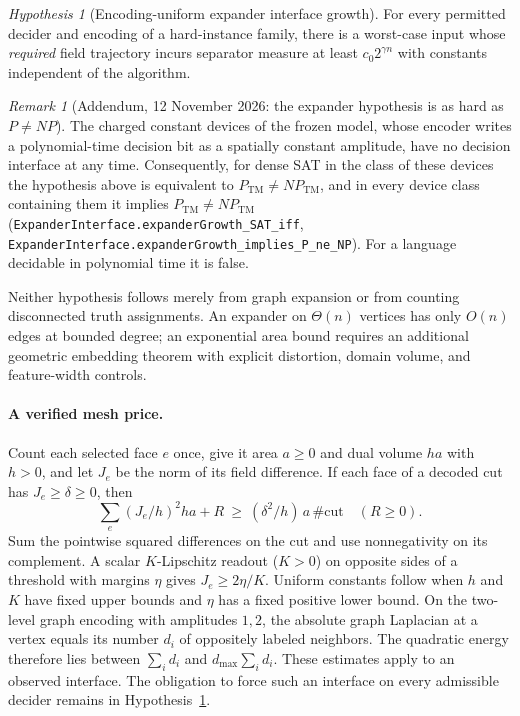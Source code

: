 \documentclass[12pt]{article}
\theoremstyle{remark}
\newtheorem*{remark}{Remark}
\newtheorem{hypothesis}{Hypothesis}[section]
\begin{document}
\begin{hypothesis}[Encoding-uniform expander interface growth]
\label{prop:locked-expander-full}
For every permitted decider and encoding of a hard-instance family,
there is a worst-case input whose \emph{required} field trajectory
incurs separator measure at least $c_0 2^{\gamma n}$ with constants
independent of the algorithm.
\end{hypothesis}
\begin{remark}[Addendum, 12 November 2026: the expander hypothesis is as hard as $P\ne NP$]
The charged constant devices of the frozen model, whose encoder writes a
polynomial-time decision bit as a spatially constant amplitude, have no
decision interface at any time.  Consequently, for dense SAT in the class
of these devices the hypothesis above is equivalent to
$P_{\mathrm{TM}}\ne NP_{\mathrm{TM}}$, and in every device class
containing them it implies $P_{\mathrm{TM}}\ne NP_{\mathrm{TM}}$
(\nolinkurl{ExpanderInterface.expanderGrowth_SAT_iff},
\nolinkurl{ExpanderInterface.expanderGrowth_implies_P_ne_NP}).  For a
language decidable in polynomial time it is false.
\end{remark}
Neither hypothesis follows merely from graph expansion or from
counting disconnected truth assignments. An expander on $\Theta(n)$
vertices has only $O(n)$ edges at bounded degree; an exponential
area bound requires an additional geometric embedding theorem with
explicit distortion, domain volume, and feature-width controls.

\paragraph{A verified mesh price.}
Count each selected face $e$ once, give it area $a\ge0$ and dual volume
$ha$ with $h>0$, and let $J_e$ be the norm of its field difference.
If each face of a decoded cut has $J_e\ge\delta\ge0$, then
\[
 \sum_e (J_e/h)^2ha+R\ \ge\ (\delta^2/h)\,a\,\#\mathrm{cut}
 \quad(R\ge0).
\]
Sum the pointwise squared differences on the cut and use nonnegativity
on its complement. A scalar $K$-Lipschitz readout ($K>0$) on opposite
sides of a threshold with margins $\eta$ gives $J_e\ge2\eta/K$.
Uniform constants follow when $h$ and $K$ have fixed upper bounds and
$\eta$ has a fixed positive lower bound. On the two-level graph encoding
with amplitudes $1,2$, the absolute graph Laplacian at a vertex equals
its number $d_i$ of oppositely labeled neighbors. The quadratic energy
therefore lies between $\sum_i d_i$ and $d_{\max}\sum_i d_i$.
These estimates apply to an observed interface. The obligation to force
such an interface on every admissible decider remains in
Hypothesis~\ref{prop:locked-expander-full}.
\end{document}
